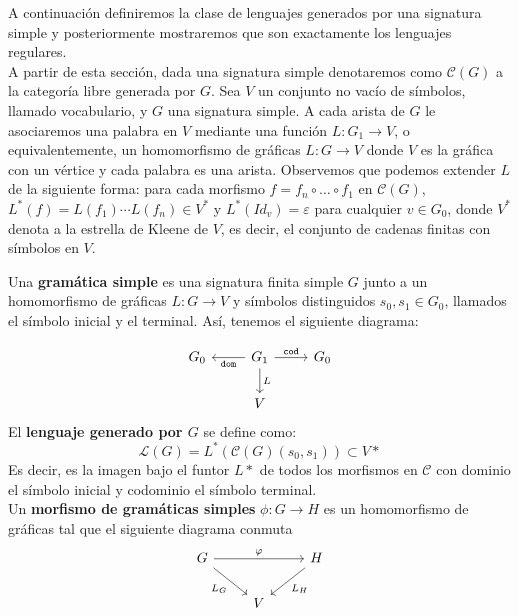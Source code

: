 \documentclass[../main.tex]{subfiles}
\begin{document}
A continuación definiremos la clase de lenguajes generados por una signatura simple y posteriormente mostraremos que son exactamente los lenguajes regulares. \\
A partir de esta sección, dada una signatura simple denotaremos como $\mathcal{C}(G)$ a la categoría libre generada por $G$. 
Sea $V$ un conjunto no vacío de símbolos, llamado vocabulario, y $G$ una signatura simple. A cada arista de $G$ le asociaremos una palabra en $V$ mediante una función $L: G_1 \to V$, o equivalentemente, un homomorfismo de gráficas $L: G \to V$ donde $V$ es la gráfica con un vértice y cada palabra es una arista. Observemos que podemos extender $L$ de la siguiente forma: para cada morfismo $f=f_n \circ \dots \circ f_1$ en $\mathcal{C}(G)$, $L^*(f)=L(f_1)\cdots L(f_n) \in V^*$ y $L^*(Id_v)=\varepsilon$ para cualquier $v \in G_0$, donde $V^* $ denota a la estrella de Kleene de $V$, es decir, el conjunto de cadenas finitas con símbolos en $V$. \\

\begin{dfn}
	Una \textbf{gramática simple} es una signatura finita simple $G$ junto a un homomorfismo de gráficas $L: G \to V$  y símbolos distinguidos $s_0, s_1 \in G_0$, llamados el símbolo inicial y el terminal. Así, tenemos el siguiente diagrama:  
	
	\[
	\begin{tikzcd}
		G_0 & G_1 \arrow{l}{\texttt{dom}} \arrow{r}{\texttt{cod}} \arrow{d}{L} & G_0 \\
		& V &
	\end{tikzcd}
	\]
El \textbf{lenguaje generado por $G$} se define como: \\
	\[
		\mathcal{L}(G)=L^*(\mathcal{C}(G)(s_0,s_1)) \subset V*
	\]
Es decir, es la imagen bajo el funtor $L*$ de todos los morfismos en $\mathcal{C}$ con dominio el símbolo inicial y codominio el símbolo terminal.  \\
	Un \textbf{morfismo de gramáticas simples} $\phi : G \to H$ es un homomorfismo de gráficas tal que el siguiente diagrama conmuta
	\[
		\begin{tikzcd}
			G \arrow{rr}{\phi} \arrow[swap]{rd}{L_G} & & H \arrow{ld}{L_H} \\
			& V &
		\end{tikzcd}
	\]
	
\end{dfn}
\end{document}
